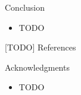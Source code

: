 \documentclass[final,hyperref={pdfpagelabels=false}]{beamer}
\begin{document}
\begin{frame}[t]
\begin{columns}[t]
\begin{column}{.465\textwidth}
\begin{block}{Conclusion}

\begin{itemize}
\item TODO
\end{itemize}

\end{block}


\begin{block}{[TODO] References}
\small{
}

\end{block}


\begin{block}{Acknowledgments}

\begin{itemize}
\item TODO
\end{itemize}


\end{block}
\end{column}
\end{columns}
\end{frame}
\end{document}
